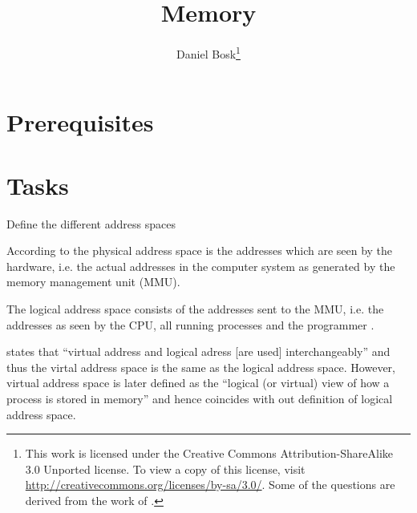 \documentclass[a4paper]{miunasgn}
\title{Memory}
\author{Daniel Bosk\footnote{%
	This work is licensed under the Creative Commons Attribution-ShareAlike 3.0 
	Unported license.
	To view a copy of this license, visit 
	\url{http://creativecommons.org/licenses/by-sa/3.0/}.
	Some of the questions are derived from the work of 
	\citeauthor*{Silberschatz2009osc}.
}}
\date{\svnId}
\theoremstyle{definition}
\begin{document}
\maketitle
\thispagestyle{foot}
\tableofcontents


\section{Prerequisites}
\label{sec:Prerequisites}



\section{Tasks}
\label{sec:Tasks}
\begin{questions}


	\question\label{q:addressspaces}
	Define the different address spaces
	\begin{solution}
		According to \citet[p. 319]{Silberschatz2009osc} the physical address space 
		is the addresses which are seen by the hardware, i.e. the actual addresses 
		in the computer system as generated by the memory management unit (MMU).

		The logical address space consists of the addresses sent to the MMU, i.e.  
		the addresses as seen by the CPU, all running processes and the programmer 
		\citep[ch. 8]{Silberschatz2009osc}.

		\citet{Silberschatz2009osc} states that ``virtual address and logical 
		adress [are used] interchangeably'' \citep[p. 319]{Silberschatz2009osc} and 
		thus the virtal address space is the same as the logical address space.
		However, virtual address space is later defined as the ``logical (or 
		virtual) view of how a process is stored in memory'' \citep[p.  
		359]{Silberschatz2009osc} and hence coincides with out definition of 
		logical address space.
	\end{solution}


\end{questions}
\end{document}
